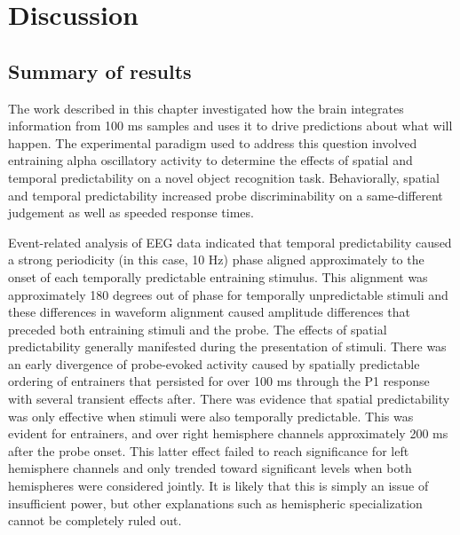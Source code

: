 \documentclass[dwyatte_dissertation.tex]{subfiles}
\begin{document}

\section{Discussion}

\subsection{Summary of results}
The work described in this chapter investigated how the brain integrates information from 100 ms samples and uses it to drive predictions about what will happen. The experimental paradigm used to address this question involved entraining alpha oscillatory activity to determine the effects of spatial and temporal predictability on a novel object recognition task. Behaviorally, spatial and temporal predictability increased probe discriminability on a same-different judgement as well as speeded response times. %

Event-related analysis of EEG data indicated that temporal predictability caused a strong periodicity (in this case, 10 Hz) phase aligned approximately to the onset of each temporally predictable entraining stimulus. This alignment was approximately 180 degrees out of phase for temporally unpredictable stimuli and these differences in waveform alignment caused amplitude differences that preceded both entraining stimuli and the probe. The effects of spatial predictability generally manifested during the presentation of stimuli. There was an early divergence of probe-evoked activity caused by spatially predictable ordering of entrainers that persisted for over 100 ms through the P1 response with several transient effects after. There was evidence that spatial predictability was only effective when stimuli were also temporally predictable. This was evident for entrainers, and over right hemisphere channels approximately 200 ms after the probe onset. This latter effect failed to reach significance for left hemisphere channels and only trended toward significant levels when both hemispheres were considered jointly. It is likely that this is simply an issue of insufficient power, but other explanations such as hemispheric specialization \cite[e.g.,]{Marsolek99,Dien09b} cannot be completely ruled out.
\end{document}
